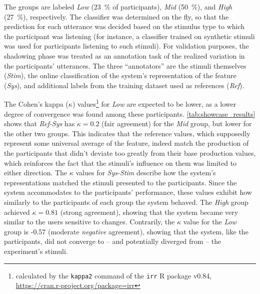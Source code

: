 The groups are labeled \emph{Low} (\SI{23}{\percent} of participants), \emph{Mid} (\SI{50}{\percent}), and \emph{High} (\SI{27}{\percent}), respectively.
The classifier was determined on the fly, so that the prediction for each utterance was decided based on the stimulus type to which the participant was listening (for instance, a classifier trained on synthetic stimuli was used for participants listening to such stimuli).
For validation purposes, the shadowing phase was treated as an annotation task of the realized variation in the participants' utterances.
The three \enquote{annotators} are the stimuli themselves (\emph{Stim}), the online classification of the system's representation of the feature (\emph{Sys}), and additional labels from the training dataset used as references (\emph{Ref}).

The Cohen's kappa ($\kappa$) values\footnote{calculated by the \texttt{kappa2} command of the \texttt{irr} R package v0.84, \url{https://cran.r-project.org/package=irr}} for \emph{Low} are expected to be lower, as a lower degree of convergence was found among these participants.
\cref{tab:showcase_results} shows that \emph{Ref-Sys} has $\kappa = 0.2$ (fair agreement) for the \emph{Mid} group, but lower for the other two groups.
This indicates that the reference values, which supposedly represent some universal average of the feature, indeed match the production of the participants that didn't deviate too greatly from their base production values, which reinforces the fact that the stimuli's influence on them was limited to either direction.
The $\kappa$ values for \emph{Sys-Stim} describe how the system's representations matched the stimuli presented to the participants.
Since the system accommodates to the participants' performance, these values exhibit how similarly to the participants of each group the system behaved.
The \emph{High} group achieved $\kappa = 0.81$ (strong agreement), showing that the system became very similar to the users sensitive to changes.
Contrarily, the $\kappa$ value for the \emph{Low} group is -0.57 (moderate \emph{negative} agreement), showing that the system, like the participants, did not converge to -- and potentially diverged from -- the experiment's stimuli.
